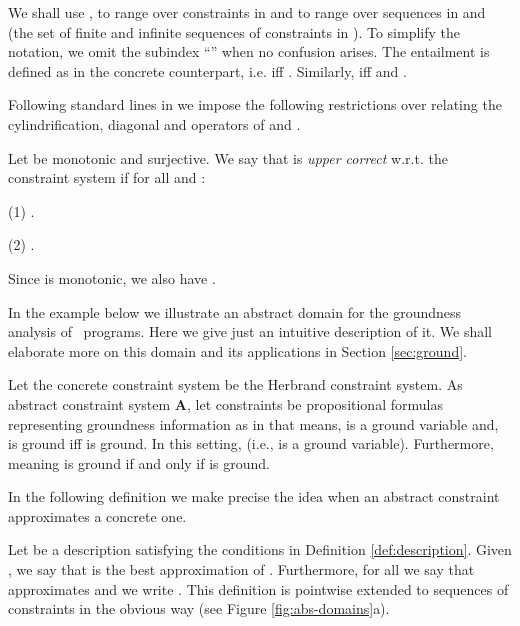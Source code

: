 \documentclass{tlp}
\begin{document}
We shall use ,  to range over constraints in  and  to range over sequences in  and  (the set of finite and infinite sequences of constraints in ). To simplify the notation, we omit the 
subindex ``'' when no confusion arises.  The entailment  is defined as in the concrete counterpart, i.e.   iff . Similarly,    iff 
 and 
. 


Following standard lines in \cite{DBLP:journals/jlp/GiacobazziDL95,Falaschi:97:TCS,ZaffanellaGL97}  we impose the following restrictions over  relating  the cylindrification, diagonal and  operators of  and . 


\begin{definition}[Correctness]\label{dec:corapp}
Let  be monotonic and surjective. We say that  is \emph{upper correct} w.r.t. the constraint system 
  if for all  and :

\noindent (1)  .

\noindent (2) . 


Since  is monotonic, we also have . 


\end{definition}



In the example below we illustrate an abstract domain for the groundness analysis of \tccp\ programs. Here we give just an intuitive description of it. We shall elaborate more on this domain and its applications in  Section \ref{sec:ground}.
 
\begin{example}\label{ex:hcs}
Let the concrete constraint system  be the  Herbrand constraint system. As abstract constraint system {\bf A}, let constraints be propositional formulas 
 representing groundness information as in   that means,  is a ground variable and,   is ground iff  is ground. In this setting,   (i.e.,  is a ground variable). Furthermore,  meaning  is ground if and only if  is ground. 


\end{example}

In the following definition we  make precise the idea  when an  abstract constraint   approximates a concrete one. 

\begin{definition}[Approximations]\label{def:approximations}
Let  be a description  satisfying the conditions in Definition \ref{def:description}.   Given , we say that  is the best approximation of . Furthermore, for all  we say that  approximates  and we write .  This definition is pointwise extended  to sequences of constraints in the obvious way (see Figure \ref{fig:abs-domains}a). 


\end{definition}
\end{document}
